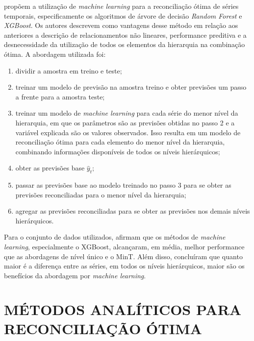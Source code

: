 \documentclass[
  12pt,
  oneside,
  a4paper,
  chapter=TITLE,
  section=TITLE,
  brazil]{abntex2}
\providecommand{\tightlist}{%
  \setlength{\itemsep}{0pt}\setlength{\parskip}{0pt}}\usepackage{longtable,booktabs,array}
\begin{document}
\textcite{spiliotis_hierarchical_2021} propõem a utilização de
\emph{machine learning} para a reconciliação ótima de séries temporais,
especificamente os algoritmos de árvore de decisão \emph{Random Forest}
e \emph{XGBoost}. Os autores descrevem como vantagens desse método em
relação aos anteriores a descrição de relacionamentos não lineares,
performance preditiva e a desnecessidade da utilização de todos os
elementos da hierarquia na combinação ótima. A abordagem utilizada foi:

\begin{enumerate}
\def\labelenumi{\arabic{enumi}.}
\tightlist
\item
  dividir a amostra em treino e teste;
\item
  treinar um modelo de previsão na amostra treino e obter previsões um
  passo a frente para a amostra teste;
\item
  treinar um modelo de \emph{machine learning} para cada série do menor
  nível da hierarquia, em que os parâmetros são as previsões obtidas no
  passo 2 e a variável explicada são os valores observados. Isso resulta
  em um modelo de reconciliação ótima para cada elemento do menor nível
  da hierarquia, combinando informações disponíveis de todos os níveis
  hierárquicos;
\item
  obter as previsões base \(\hat{y}_t\);
\item
  passar as previsões base ao modelo treinado no passo 3 para se obter
  as previsões reconciliadas para o menor nível da hierarquia;
\item
  agregar as previsões reconciliadas para se obter as previsões nos
  demais níveis hierárquicos.
\end{enumerate}

Para o conjunto de dados utilizados,
\textcite{spiliotis_hierarchical_2021} afirmam que os métodos de
\emph{machine learning}, especialmente o XGBoost, alcançaram, em média,
melhor performance que as abordagens de nível único e o MinT. Além
disso, concluíram que quanto maior é a diferença entre as séries, em
todos os níveis hierárquicos, maior são os benefícios da abordagem por
\emph{machine learning}.

\hypertarget{muxe9todos-analuxedticos-para-reconciliauxe7uxe3o-uxf3tima}{%
\section{MÉTODOS ANALÍTICOS PARA RECONCILIAÇÃO
ÓTIMA}\label{muxe9todos-analuxedticos-para-reconciliauxe7uxe3o-uxf3tima}}
\end{document}
